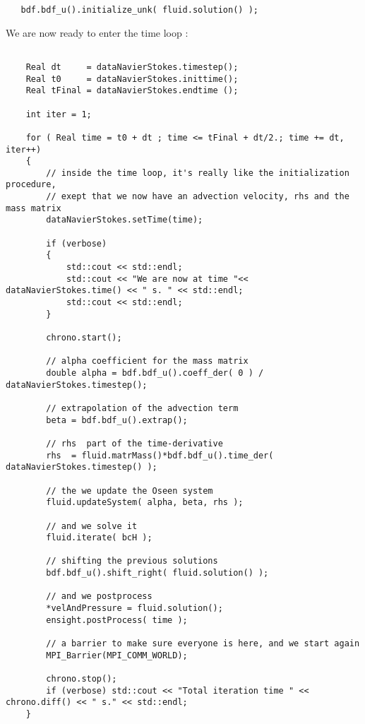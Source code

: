 \begin{verbatim}
   bdf.bdf_u().initialize_unk( fluid.solution() );
\end{verbatim}

We are now ready to enter the time loop :

\begin{verbatim}

    Real dt     = dataNavierStokes.timestep();
    Real t0     = dataNavierStokes.inittime();
    Real tFinal = dataNavierStokes.endtime ();

    int iter = 1;

    for ( Real time = t0 + dt ; time <= tFinal + dt/2.; time += dt, iter++)
    {
        // inside the time loop, it's really like the initialization procedure,
        // exept that we now have an advection velocity, rhs and the mass matrix
        dataNavierStokes.setTime(time);

        if (verbose)
        {
            std::cout << std::endl;
            std::cout << "We are now at time "<< dataNavierStokes.time() << " s. " << std::endl;
            std::cout << std::endl;
        }

        chrono.start();

        // alpha coefficient for the mass matrix
        double alpha = bdf.bdf_u().coeff_der( 0 ) / dataNavierStokes.timestep();

        // extrapolation of the advection term
        beta = bdf.bdf_u().extrap();

        // rhs  part of the time-derivative
        rhs  = fluid.matrMass()*bdf.bdf_u().time_der( dataNavierStokes.timestep() );

        // the we update the Oseen system
        fluid.updateSystem( alpha, beta, rhs );

        // and we solve it
        fluid.iterate( bcH );

        // shifting the previous solutions
        bdf.bdf_u().shift_right( fluid.solution() );

        // and we postprocess
        *velAndPressure = fluid.solution();
        ensight.postProcess( time );

        // a barrier to make sure everyone is here, and we start again
        MPI_Barrier(MPI_COMM_WORLD);

        chrono.stop();
        if (verbose) std::cout << "Total iteration time " << chrono.diff() << " s." << std::endl;
    }

\end{verbatim}

